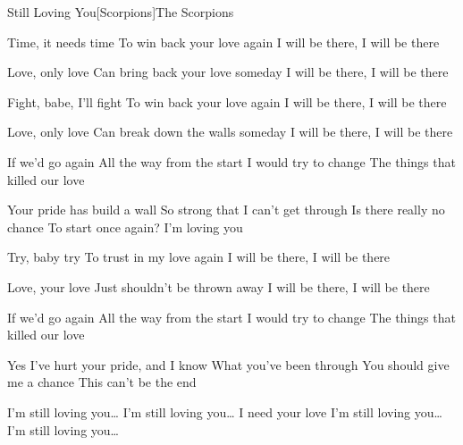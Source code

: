 \documentclass[a4paper,11pt,french]{article}
\begin{document}

\begin{Song}{Still Loving You}[Scorpions]{The Scorpions}
\begin{multicols}{2}
\begin{Verse}
Time, it needs time 
To win back your love again
I will be there, I will be there
\espaceInterStrophe

Love, only love 
Can bring back your love someday
I will be there, I will be there
\espaceInterStrophe

Fight, babe, I'll fight 
To win back your love again
I will be there, I will be there
\espaceInterStrophe

Love, only love 
Can break down the walls someday
I will be there, I will be there
\end{Verse}
\espaceInterStrophe

\begin{Chorus}
If we'd go again 
All the way from the start
I would try to change 
The things that killed our love
\espaceInterStrophe

Your pride has build a wall 
So strong that I can't get through
Is there really no chance 
To start once again?
I'm loving you
\end{Chorus}
\espaceInterStrophe

\begin{Verse}
Try, baby try 
To trust in my love again
I will be there, I will be there 
\espaceInterStrophe

Love, your love 
Just shouldn't be thrown away
I will be there, I will be there
\end{Verse}
\espaceInterStrophe

\espaceInterStrophe

\begin{Chorus}
If we'd go again 
All the way from the start
I would try to change 
The things that killed our love
\espaceInterStrophe

Yes I've hurt your pride, and I know 
What you've been through
You should give me a chance 
This can't be the end
\espaceInterStrophe

I'm still loving you\dots
I'm still loving you\dots
\bis
I need your love
I'm still loving you\dots
I'm still loving you\dots
\adlib
\end{Chorus}
\end{multicols}

\vfill


\end{Song}
\end{document}
